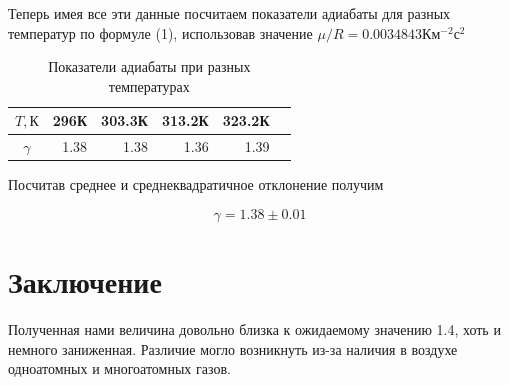 \documentclass[a4paper, 12pt]{article}
\begin{document}
    Теперь имея все эти данные посчитаем показатели адиабаты для разных температур по формуле (1), использовав значение $\mu/R=0.0034843Км^{-2}с^2$


    \begin{table}[h]
        \begin{center}
            \begin{tabular}{|c|r|r|r|r|r|}
                \hline
                {$T, К$} &   296К &  303.3К &  313.2К &  323.2К \\\hline
                {$\gamma$} &   1.38 & 1.38 & 1.36 & 1.39 \\\hline
            \end{tabular}
        \end{center}
        \caption{Показатели адиабаты при разных температурах}
    \end{table}

    Посчитав среднее и среднеквадратичное отклонение получим

    \begin{equation}
        \gamma = 1.38 \pm 0.01
    \end{equation}

    \section{Заключение}
    Полученная нами величина довольно близка к ожидаемому значению 1.4, хоть и немного заниженная.
    Различие могло возникнуть из-за наличия в воздухе одноатомных и многоатомных газов.
\end{document}
